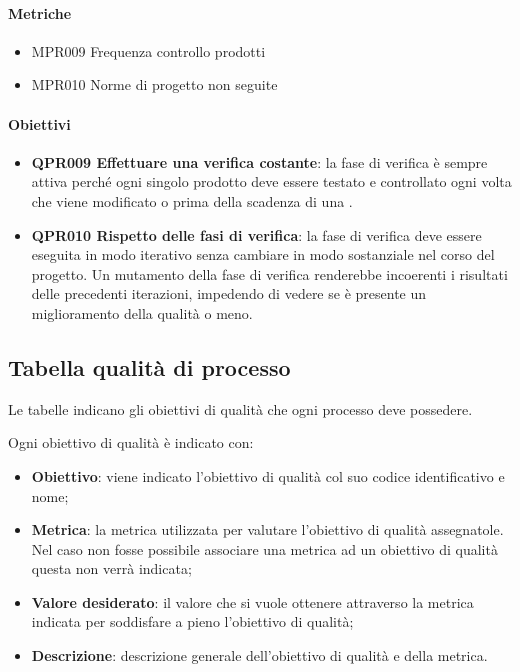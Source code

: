 		\paragraph*{Metriche}
		
		\begin{itemize}
			\item MPR009 Frequenza controllo prodotti
			\item MPR010 Norme di progetto non seguite
		\end{itemize}
		
		\paragraph*{Obiettivi}
		
		\begin{itemize}
			\item \textbf{QPR009 Effettuare una verifica costante}: la fase di verifica è sempre attiva perché ogni singolo prodotto deve essere testato e controllato ogni volta che viene modificato o prima della scadenza di una .
			\item \textbf{QPR010 Rispetto delle fasi di verifica}: la fase di verifica deve essere eseguita in modo iterativo senza cambiare in modo sostanziale nel corso del progetto. Un mutamento della fase di verifica renderebbe incoerenti i risultati delle precedenti iterazioni, impedendo di vedere se è presente un miglioramento della qualità o meno.
		\end{itemize}

\subsection{Tabella qualità di processo}
Le tabelle indicano gli obiettivi di qualità che ogni processo deve possedere.

Ogni obiettivo di qualità è indicato con:

\begin{itemize}
	\item \textbf{Obiettivo}: viene indicato l'obiettivo di qualità col suo codice identificativo e nome;
	\item \textbf{Metrica}: la metrica utilizzata per valutare l'obiettivo di qualità assegnatole. Nel caso non fosse possibile associare una metrica ad un obiettivo di qualità questa non verrà indicata;
	\item \textbf{Valore desiderato}: il valore che si vuole ottenere attraverso la metrica indicata per soddisfare a pieno l'obiettivo di qualità;
	\item \textbf{Descrizione}: descrizione generale dell'obiettivo di qualità e della metrica.
\end{itemize}

